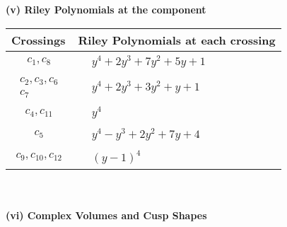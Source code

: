 \documentclass[1p]{elsarticle_modified}
\theoremstyle{definition}
\begin{document}
\newpage\renewcommand{\arraystretch}{1}
\flushleft \textbf{(v) Riley Polynomials at the component}\newline \\
\begin{tabular}{m{50pt}|m{274pt}}
Crossings & \hspace{64pt}Riley Polynomials at each crossing \\
\hline $$\begin{aligned}c_{1},c_{8}\end{aligned}$$&$\begin{aligned}
&y^4+2 y^3+7 y^2+5 y+1
\end{aligned}$\\
\hline $$\begin{aligned}c_{2},c_{3},c_{6}\\c_{7}\end{aligned}$$&$\begin{aligned}
&y^4+2 y^3+3 y^2+y+1
\end{aligned}$\\
\hline $$\begin{aligned}c_{4},c_{11}\end{aligned}$$&$\begin{aligned}
&y^4
\end{aligned}$\\
\hline $$\begin{aligned}c_{5}\end{aligned}$$&$\begin{aligned}
&y^4- y^3+2 y^2+7 y+4
\end{aligned}$\\
\hline $$\begin{aligned}c_{9},c_{10},c_{12}\end{aligned}$$&$\begin{aligned}
&(y-1)^4
\end{aligned}$\\
\hline
\end{tabular}\\~\\
\newpage\flushleft \textbf{(vi) Complex Volumes and Cusp Shapes}
\end{document}
